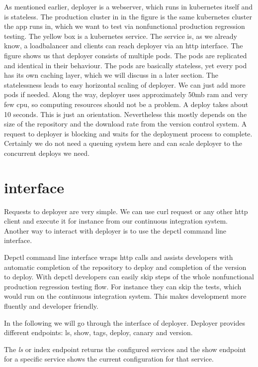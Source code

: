 As mentioned earlier, deployer is a webserver, which runs in kubernetes itself and is
stateless. The production cluster in in the figure is the same kubernetes cluster the app
runs in, which we want to test via nonfunctional production regression testing. The yellow
box is a kubernetes service. The service is, as we already know, a loadbalancer and
clients can reach deployer via an http interface. The figure shows us that deployer
consists of multiple pods. The pods are replicated and identical in their behaviour. The
pods are basically stateless, yet every pod has its own caching layer, which we will
discuss in a later section. The statelessness leads to easy horizontal scaling of
deployer. We can just add more pods if needed. Along the way, deployer uses approximately
50mb ram and very few cpu, so computing resources should not be a problem. A deploy takes
about 10 seconds. This is just an orientation. Nevertheless this mostly depends on the
size of the repository and the download rate from the version control system. A request to
deployer is blocking and waits for the deployment process to complete. Certainly we do not
need a queuing system here and can scale deployer to the concurrent deploys we need.


\section{interface}

Requests to deployer are very simple. We can use curl request or any other http client and
execute it for instance from our continuous integration system. Another way to interact
with deployer is to use the depctl command line interface.

Depctl command line interface wraps http calls and assists developers with automatic
completion of the repository to deploy and completion of the version to deploy. With
depctl developers can easily skip steps of the whole nonfunctional production regression
testing flow. For instance they can skip the tests, which would run on the continuous
integration system. This makes development more fluently and developer friendly.

In the following we will go through the interface of deployer. Deployer provides different
endpoints: ls, show, tags, deploy, canary and version.

The \emph{ls} or index endpoint returns the configured services and the show endpoint for a
specific service shows the current configuration for that service.

